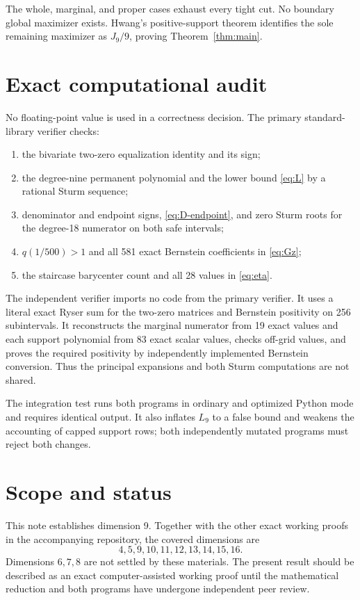 \documentclass[11pt]{article}
\theoremstyle{remark}
\begin{document}
The whole, marginal, and proper cases exhaust every tight cut.  No boundary
global maximizer exists.  Hwang's positive-support theorem identifies the
sole remaining maximizer as $J_9/9$, proving Theorem~\ref{thm:main}.

\section{Exact computational audit}

No floating-point value is used in a correctness decision.  The primary
standard-library verifier checks:
\begin{enumerate}
\item the bivariate two-zero equalization identity and its sign;
\item the degree-nine permanent polynomial and the lower bound \eqref{eq:L}
by a rational Sturm sequence;
\item denominator and endpoint signs, \eqref{eq:D-endpoint}, and zero Sturm
roots for the degree-18 numerator on both safe intervals;
\item $q(1/500)>1$ and all 581 exact Bernstein coefficients in
\eqref{eq:Gz};
\item the staircase barycenter count and all 28 values in \eqref{eq:eta}.
\end{enumerate}

The independent verifier imports no code from the primary verifier.  It uses
a literal exact Ryser sum for the two-zero matrices and Bernstein positivity
on 256 subintervals.  It reconstructs the marginal numerator from 19 exact
values and each support polynomial from 83 exact scalar values, checks
off-grid values, and proves the required positivity by independently
implemented Bernstein conversion.  Thus the principal expansions and both
Sturm computations are not shared.

The integration test runs both programs in ordinary and optimized Python mode
and requires identical output.  It also inflates $L_9$ to a false bound and
weakens the accounting of capped support rows; both independently mutated
programs must reject both changes.

\section{Scope and status}

This note establishes dimension 9.  Together with the other exact working
proofs in the accompanying repository, the covered dimensions are
\[
 4,5,9,10,11,12,13,14,15,16.
\]
Dimensions $6,7,8$ are not settled by these materials.  The present result
should be described as an exact computer-assisted working proof until the
mathematical reduction and both programs have undergone independent peer
review.
\end{document}
